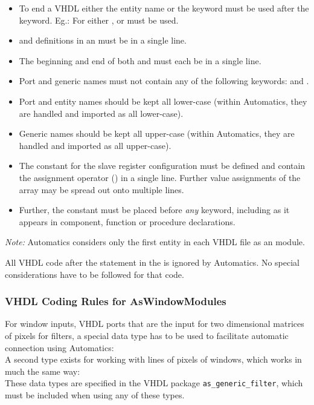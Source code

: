 \begin{itemize}
\item To end a VHDL  either the entity name or the keyword  must be used after the  keyword. Eg.: For  either ,  or  must be used.
\item {} and  definitions in an  must be in a single line.
\item The beginning and end of both  and  must each be in a single line.
\item Port and generic names must not contain any of the following keywords:  and .
\item Port and entity names should be kept all lower-case (within Automatics, they are handled and imported as all lower-case).
\item Generic names should be kept all upper-case (within Automatics, they are handled and imported as all upper-case).
\item The constant for the slave register configuration must be defined and contain the assignment operator (\lsthdlinline{:=}) in a single line. Further value assignments of the array may be spread out onto multiple lines.
\item Further, the constant must be placed before \emph{any}  keyword, including  as it appears in component, function or procedure declarations.
\end{itemize}

\emph{Note:} Automatics considers only the first entity in each VHDL file as an \asterics module.

All VHDL code after the  statement in the  is ignored by Automatics.
No special considerations have to be followed for that code.

\subsubsection{VHDL Coding Rules for AsWindowModules}

For window inputs, VHDL ports that are the input for two dimensional matrices of pixels for filters, a special data type has to be used to facilitate automatic connection using Automatics:
\\
A second type exists for working with lines of pixels of windows, which works in much the same way:
\\
These data types are specified in the \asterics VHDL package \texttt{as\_generic\_filter}, which must be included when using any of these types.

